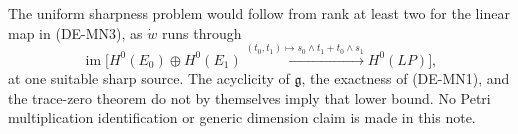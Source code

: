 \begin{remark}
\label{rem:DE-A3-positive-monad-gate-note}
The uniform sharpness problem would follow from rank at least two
for the linear map in (DE-MN3), as $\dot w$ runs through
\[
\operatorname{im}\bigl[H^0(E_0)\oplus H^0(E_1)
\xrightarrow{(t_0,t_1)\mapsto s_0\wedge t_1+t_0\wedge s_1}
H^0(LP)\bigr],
\]
at one suitable sharp source. The acyclicity of $\mathfrak g$,
the exactness of (DE-MN1), and the trace-zero theorem do not by
themselves imply that lower bound. No Petri multiplication
identification or generic dimension claim is made in this note.
\end{remark}
